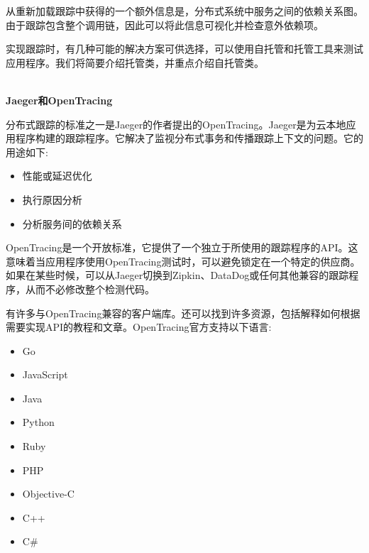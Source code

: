 从重新加载跟踪中获得的一个额外信息是，分布式系统中服务之间的依赖关系图。由于跟踪包含整个调用链，因此可以将此信息可视化并检查意外依赖项。


实现跟踪时，有几种可能的解决方案可供选择，可以使用自托管和托管工具来测试应用程序。我们将简要介绍托管类，并重点介绍自托管类。

\hspace*{\fill} \\ %
\noindent
\textbf{Jaeger和OpenTracing}

分布式跟踪的标准之一是Jaeger的作者提出的OpenTracing。Jaeger是为云本地应用程序构建的跟踪程序。它解决了监视分布式事务和传播跟踪上下文的问题。它的用途如下:

\begin{itemize}
\item 
性能或延迟优化

\item 
执行原因分析

\item 
分析服务间的依赖关系
\end{itemize}

OpenTracing是一个开放标准，它提供了一个独立于所使用的跟踪程序的API。这意味着当应用程序使用OpenTracing测试时，可以避免锁定在一个特定的供应商。如果在某些时候，可以从Jaeger切换到Zipkin、DataDog或任何其他兼容的跟踪程序，从而不必修改整个检测代码。

有许多与OpenTracing兼容的客户端库。还可以找到许多资源，包括解释如何根据需要实现API的教程和文章。OpenTracing官方支持以下语言:

\begin{itemize}
\item 
Go

\item 
JavaScript

\item 
Java

\item 
Python

\item 
Ruby

\item 
PHP

\item 
Objective-C

\item 
C++

\item 
C\#
\end{itemize}


